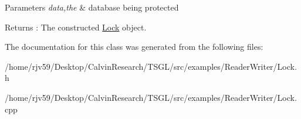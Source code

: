\begin{DoxyParams}{Parameters}
{\em data,the} & database being protected \\
\hline
\end{DoxyParams}
\begin{DoxyReturn}{Returns}
\+: The constructed \hyperlink{class_lock}{Lock} object. 
\end{DoxyReturn}


The documentation for this class was generated from the following files\+:\begin{DoxyCompactItemize}
\item 
/home/rjv59/\+Desktop/\+Calvin\+Research/\+T\+S\+G\+L/src/examples/\+Reader\+Writer/Lock.\+h\item 
/home/rjv59/\+Desktop/\+Calvin\+Research/\+T\+S\+G\+L/src/examples/\+Reader\+Writer/Lock.\+cpp\end{DoxyCompactItemize}
